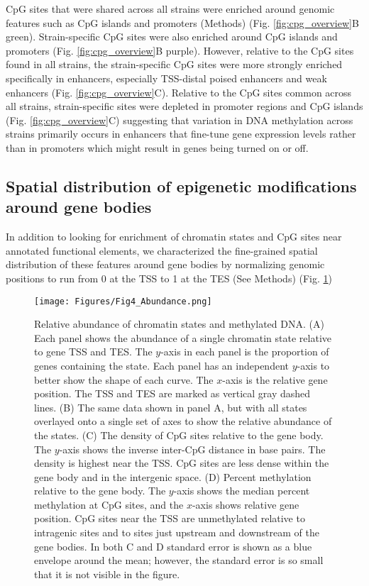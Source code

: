 \documentclass[
  11pt,
]{article}
\begin{document}
CpG sites that were shared across all strains were enriched around
genomic features such as CpG islands and promoters (Methods) (Fig.
\ref{fig:cpg_overview}B green). Strain-specific CpG sites were also
enriched around CpG islands and promoters (Fig. \ref{fig:cpg_overview}B
purple). However, relative to the CpG sites found in all strains, the
strain-specific CpG sites were more strongly enriched specifically in
enhancers, especially TSS-distal poised enhancers and weak enhancers
(Fig. \ref{fig:cpg_overview}C). Relative to the CpG sites common across
all strains, strain-specific sites were depleted in promoter regions and
CpG islands (Fig. \ref{fig:cpg_overview}C) suggesting that variation in
DNA methylation across strains primarily occurs in enhancers that
fine-tune gene expression levels rather than in promoters which might
result in genes being turned on or off.

\hypertarget{spatial-distribution-of-epigenetic-modifications-around-gene-bodies}{%
\subsection{Spatial distribution of epigenetic modifications around gene
bodies}\label{spatial-distribution-of-epigenetic-modifications-around-gene-bodies}}

In addition to looking for enrichment of chromatin states and CpG sites
near annotated functional elements, we characterized the fine-grained
spatial distribution of these features around gene bodies by normalizing
genomic positions to run from 0 at the TSS to 1 at the TES (See Methods)
(Fig. \ref{fig:state_abundance})

\begin{figure}[ht!]
\texttt{[image: Figures/Fig4\_Abundance.png]} 
\caption{Relative abundance of chromatin states and methylated DNA. (A) Each panel 
shows the abundance of a single chromatin state relative to gene TSS and TES. The 
$y$-axis in each panel is the proportion of genes containing the state. Each
panel has an independent $y$-axis to better show the shape of each curve.
The $x$-axis is the relative gene position. The TSS and TES are marked as vertical
gray dashed lines. (B) The same data shown in panel A, but with all states overlayed
onto a single set of axes to show the relative abundance of the states. 
(C) The density of CpG sites relative to the gene body. The $y$-axis shows 
the inverse inter-CpG distance in base pairs. The density is highest near the 
TSS. CpG sites are less dense within the gene body and in the intergenic space. 
(D) Percent methylation relative to the gene body. The $y$-axis shows the median 
percent methylation at CpG sites, and the $x$-axis shows relative gene position. 
CpG sites near the TSS are unmethylated relative to intragenic sites and to sites
just upstream and downstream of the gene bodies. In both C and D standard error 
is shown as a blue envelope around the mean; however, the standard error is so 
small that it is not visible in the figure.}
\label{fig:state_abundance}
\end{figure}
\end{document}
